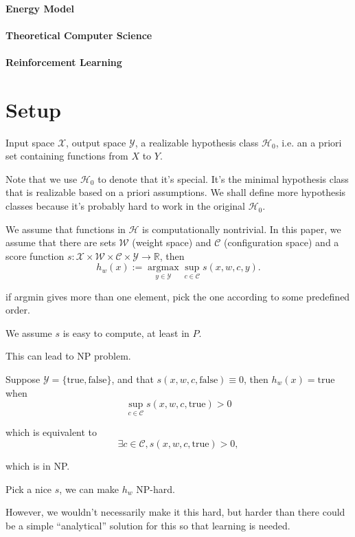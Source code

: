 \documentclass[11pt, oneside]{article}   	%
\theoremstyle{definition}
\begin{document}
\paragraph{Energy Model}

\paragraph{Theoretical Computer Science}

\paragraph{Reinforcement Learning}

\section{Setup}

Input space $\mathcal{X}$, output space $\mathcal{Y}$, a realizable hypothesis class $\mathcal{H}_0$, i.e. an a priori set containing functions from $X$ to $Y$.

Note that we use $\mathcal{H}_0$ to denote that it's special. It's the minimal hypothesis class that is realizable based on a priori assumptions. We shall define more hypothesis classes because it's probably hard to work in the original $\mathcal{H}_0$.

We assume that functions in $\mathcal{H}$ is computationally nontrivial. In this paper, we assume that there are sets $\mathcal{W}$ (weight space) and $\mathcal{C}$ (configuration space) and a score function $s: \mathcal{X}\times \mathcal{W}\times \mathcal{C}\times \mathcal{Y}\to \mathbb{R}$, then
\begin{equation}
	h_{w}(x):=\mathop{\text{argmax}}\limits_{y\in \mathcal{Y}}\sup_{c\in \mathcal{C}} s(x, w, c, y).
\end{equation}

if argmin gives more than one element, pick the one according to some predefined order.

We assume $s$ is easy to compute, at least in $P$.

\begin{rmk}
	This can lead to NP problem.

	Suppose $\mathcal{Y} = \{\text{true}, \text{false}\}$, and that $s(x,w,c,\text{false})\equiv 0$, then $h_w(x)=\text{true}$ when
	\begin{equation}
		\sup_{c\in \mathcal{C}}s(x, w, c, \text{true}) > 0
	\end{equation}

	which is equivalent to
	\begin{equation}
		\exists c\in \mathcal{C}, s(x, w, c, \text{true}) > 0,
	\end{equation}

	which is in NP.

	Pick a nice $s$, we can make $h_w$ NP-hard.

	However, we wouldn't necessarily make it this hard, but harder than there could be a simple ``analytical'' solution for this so that learning is needed.
\end{rmk}
\end{document}
